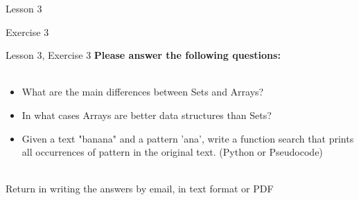 \documentclass[aspectratio=1610]{beamer}
\begin{document}
\begin{frame}{Lesson 3}{}
\begin{center}
\Huge Exercise 3
\end{center}
\end{frame}

\begin{frame}{Lesson 3, Exercise 3}{}
\Large
\textbf{Please answer the following questions:}\\~\\ 

\Large{
\begin{itemize}
	\item What are the main differences between Sets and Arrays?
	\item In what cases Arrays are better data structures than Sets?
	\item Given a text "banana" and a pattern 'ana', write a function search that prints all 
		occurrences of pattern in the original text. (Python or Pseudocode)\\~\\
\end{itemize}}

Return in writing the answers by email, in text format or PDF
\end{frame}
\end{document}
